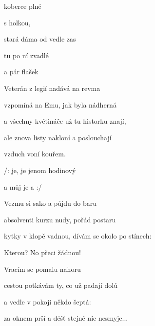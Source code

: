 

\zs
{} koberce plné 

 s holkou,  

 stará dáma od vedle zas 

 tu po ní zvadlé 

a pár  flašek

\ks
\zs

Veterán z legií nadává na revma

vzpomíná na Emu, jak byla nádherná

a všechny květináče už tu historku znají,

ale znova listy nakloní a poslouchají

vzduch voní kouřem.
\ks

\zr
/:  je,  je jenom hodinový 

a můj  je  a  :/
\kr

\zs
Vezmu si sako a půjdu do baru

absolventi kurzu nudy, pořád postaru

kytky v klopě vadnou, dívám se okolo po stínech:

Kterou? No přeci žádnou!

\ks
\zs

Vracím se pomalu nahoru

cestou potkávám ty, co už padají dolů

a vedle v pokoji někdo šeptá: 

za oknem prší a déšť stejně nic nesmyje...
\ks

\zr  \kr

\kp





